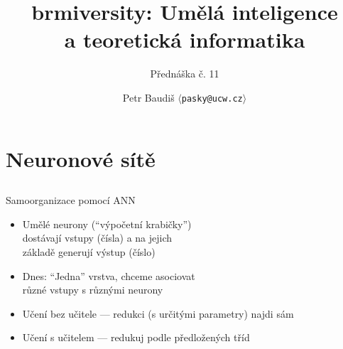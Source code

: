 \documentclass{beamer}
\begin{document}

\title{brmiversity: Umělá inteligence \\ a teoretická informatika}
\subtitle{Přednáška č. 11}
\author{Petr Baudiš $\langle${\tt pasky@ucw.cz}$\rangle$}
\date{}
\frame{\titlepage}

\section{Neuronové sítě}

\subsection{}
\begin{frame}{Samoorganizace pomocí ANN}
\begin{itemize}
\item Umělé neurony (``výpočetní krabičky'') \\ dostávají vstupy (čísla) a na jejich \\ základě generují výstup (číslo)
\item Dnes: ``Jedna'' vrstva, chceme asociovat \\ různé vstupy s různými neurony
\item Učení bez učitele --- redukci (s určitými parametry) najdi sám
\item Učení s učitelem --- redukuj podle předložených tříd
\end{itemize}
\end{frame}
\end{document}
